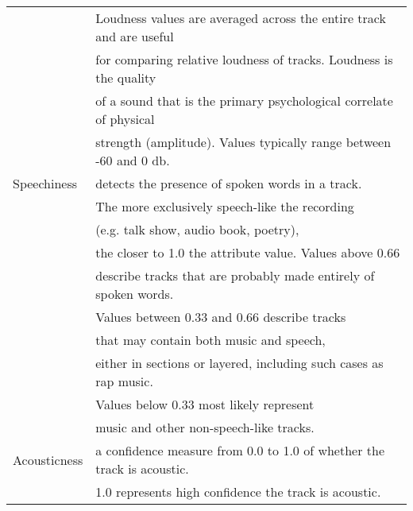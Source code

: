 \documentclass[12pt]{article}
\theoremstyle{remark}
\begin{document}
\begin{table}
\begin{tabular}{l|l}
& Loudness values are averaged across the entire track and are useful \\
& for comparing relative loudness of tracks. Loudness is the quality \\
& of a sound that is the primary psychological correlate of physical \\
& strength (amplitude). Values typically range between -60 and 0 db.\\
Speechiness & detects the presence of spoken words in a track.\\
& The more exclusively speech-like the recording\\
 &(e.g. talk show, audio book, poetry), \\
 &the closer to 1.0 the attribute value. Values above 0.66\\
 &  describe tracks that are probably made entirely of spoken words.\\
 & Values between 0.33 and 0.66 describe tracks \\
 & that may contain both music and speech, \\
 & either in sections or layered, including such cases as rap music. \\
 & Values below 0.33 most likely represent \\
 & music and other non-speech-like tracks. \\
Acousticness & a confidence measure from 0.0 to 1.0 of whether the track is acoustic.\\
& 1.0 represents high confidence the track is acoustic.\\
	\hline
	\end{tabular}
\end{table}
\end{document}
